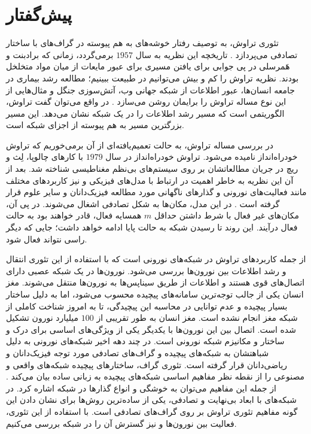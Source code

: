 \newpage
\vspace*{-1cm}
\section*{پیش‌گفتار}
تئوری تراوش، به توصیف رفتار خوشه‌های به هم پیوسته در گراف‌های با ساختار تصادفی  می‌پردازد \cite{chris}. تاریخچه این نظریه به سال $1957$ برمی‌گردد، زمانی که برادبنت و هَمرسلی در پی جوابی برای یافتن مسیری برای عبور مایعات از میان مواد متخلخل بودند\cite{broad}.  نظریه تراوش را کم و بیش می‌توانیم در طبیعت ببینیم؛ مطالعه رشد بیماری در جامعه انسان‌ها، عبور اطلاعات از شبکه جهانی وب، آتش‌سوزی جنگل و مثال‌هایی از این نوع مساله تراوش را برایمان روشن می‌سازد \cite{hasen}. در واقع می‌توان گفت تراوش، الگوریتمی است که مسیر رشد اطلاعات را در یک شبکه نشان می‌دهد. این مسیر بزرگترین مسیر به هم پیوسته از اجزای  شبکه است. 

در بررسی مساله تراوش، به حالت تعمیم‌یافته‌ای از آن برمی‌خوریم که تراوش خودراه‌انداز نامیده می‌شود.  تراوش خودراه‌انداز در سال $1979$ با کار‌های چالوپا، لِث و  ریچ در جریان مطالعاتشان بر روی سیستم‌های بی‌نظم مغناطیسی شناخته شد. بعد از آن این نظریه به خاطر اهمیت در ارتباط‌ با مدل‌های فیزیکی و نیز کاربرد‌های مختلف  مانند فعالیت‌های  نورونی و گذار‌های ناگهانی مورد مطالعه فیزیک‌دانان و سایر علوم قرار گرفته است \cite{go}.  در این مدل، مکان‌ها به شکل تصادفی اشغال می‌شوند. در پی آن، مکان‌های غیر فعال با  شرط داشتن حداقل $m$ همسایه فعال، قادر خواهند بود به حالت فعال درآیند. این روند تا رسیدن شبکه به حالت پایا ادامه خواهد داشت؛ جایی که دیگر راسی نتواند فعال شود. 

از جمله کاربرد‌های تراوش در شبکه‌های نورونی است که با  استفاده از این تئوری انتقال  و رشد اطلاعات بین نورون‌ها بررسی می‌شود. نورون‌ها در یک شبکه عصبی دارای اتصال‌های قوی هستند و اطلاعات از طریق سیناپس‌ها به نورون‌ها منتقل می‌شوند. مغز انسان یکی از جالب توجه‌ترین سامانه‌های پیچیده محسوب می‌شود، اما به دلیل ساختار بسیار پیچیده و عدم توانایی در محاسبه این پیچیدگی، تا به امروز شناخت کاملی از شبکه مغز انجام نشده است\cite{stam}. 
مغز انسان به طور تقریبی از $100$ میلیارد نورون تشکیل شده است.  اتصال بین این نورون‌ها با یکدیگر یکی از ویژگی‌های اساسی برای درک و ساختار و مکانیزم شبکه نورونی است\cite{sorian}. 
در چند دهه اخیر شبکه‌های نورونی به دلیل شباهتشان به شبکه‌های پیچیده و گراف‌های تصادفی مورد توجه فیزیک‌دانان و ریاضی‌دانان قرار گرفته است. تئوری گراف، ساختار‌های پیچیده شبکه‌های واقعی و مصنوعی را از نقطه نظر مفاهیم اساسی شبکه‌های پیچیده به زبانی ساده بیان می‌کند \cite{boccara}. از جمله این مفاهیم می‌توان به خوشگی و انواع گذار‌ها در شبکه اشاره کرد. در شبکه‌های با ابعاد بی‌نهایت و تصادفی، یکی از ساده‌ترین روش‌ها برای نشان دادن این گونه مفاهیم تئوری تراوش بر روی گراف‌های تصادفی است\cite{sorian}. با استفاده از این تئوری، فعالیت بین نورون‌ها و نیز گسترش آن را در شبکه بررسی می‌کنیم.

